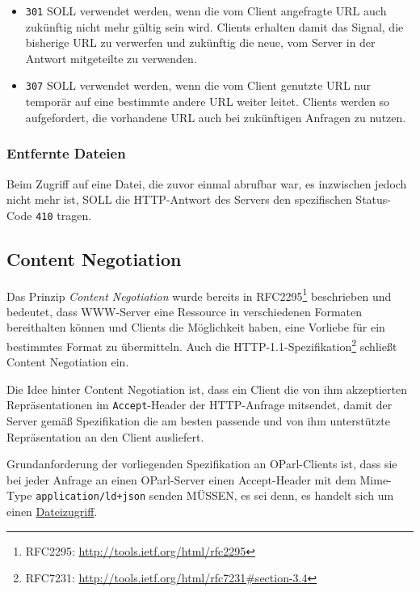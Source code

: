 \documentclass[,a4paper]{article}
\begin{document}
\begin{itemize}
\item
  \texttt{301} SOLL verwendet werden, wenn die vom Client angefragte URL
  auch zukünftig nicht mehr gültig sein wird. Clients erhalten damit das
  Signal, die bisherige URL zu verwerfen und zukünftig die neue, vom
  Server in der Antwort mitgeteilte zu verwenden.
\item
  \texttt{307} SOLL verwendet werden, wenn die vom Client genutzte URL
  nur temporär auf eine bestimmte andere URL weiter leitet. Clients
  werden so aufgefordert, die vorhandene URL auch bei zukünftigen
  Anfragen zu nutzen.
\end{itemize}

\subsubsection{Entfernte Dateien}\label{entfernte-dateien}

Beim Zugriff auf eine Datei, die zuvor einmal abrufbar war, es
inzwischen jedoch nicht mehr ist, SOLL die HTTP-Antwort des Servers den
spezifischen Status-Code \texttt{410} tragen.

\subsection{Content Negotiation}\label{contentux5fnegotiation}

Das Prinzip \emph{Content Negotiation} wurde bereits in
RFC2295\footnote{RFC2295: \url{http://tools.ietf.org/html/rfc2295}}
beschrieben und bedeutet, dass WWW-Server eine Ressource in
verschiedenen Formaten bereithalten können und Clients die Möglichkeit
haben, eine Vorliebe für ein bestimmtes Format zu übermitteln. Auch die
HTTP-1.1-Spezifikation\footnote{RFC7231:
  \url{http://tools.ietf.org/html/rfc7231\#section-3.4}} schließt
Content Negotiation ein.

Die Idee hinter Content Negotiation ist, dass ein Client die von ihm
akzeptierten Repräsentationen im \texttt{Accept}-Header der HTTP-Anfrage
mitsendet, damit der Server gemäß Spezifikation die am besten passende
und von ihm unterstützte Repräsentation an den Client ausliefert.

Grundanforderung der vorliegenden Spezifikation an OParl-Clients ist,
dass sie bei jeder Anfrage an einen OParl-Server einen Accept-Header mit
dem Mime-Type \texttt{application/ld+json} senden MÜSSEN, es sei denn,
es handelt sich um einen \hyperref[dateizugriff]{Dateizugriff}.
\end{document}
